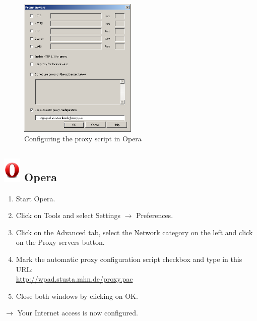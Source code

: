 \documentclass[a4paper,12pt]{scrartcl}
\begin{document}
\newpage
\begin{figure}
  \begin{center}
    \includegraphics[width=0.5\textwidth,keepaspectratio]{Bilder/Proxy_Opera_EN}
  \end{center}
  \caption{Configuring the proxy script in Opera}
\end{figure}

\subsection*{\includegraphics[height=1.2cm,keepaspectratio]{Bilder/Opera_O} Opera}
\begin{enumerate}
    \item Start Opera.
    \item Click on Tools and select Settings $\rightarrow$ Preferences.
    \item Click on the Advanced tab, select the Network category on the left and click on the Proxy servers button.
    \item Mark the automatic proxy configuration script checkbox and type in this URL: \\ \url{http://wpad.stusta.mhn.de/proxy.pac}
    \item Close both windows by clicking on OK.
\end{enumerate}
$\rightarrow$ Your Internet access is now configured.
\end{document}
